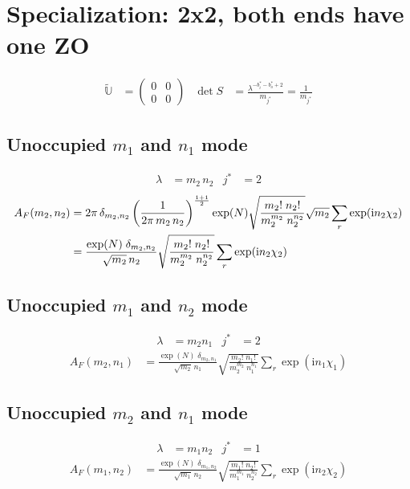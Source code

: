 \documentclass[
	english,
	a4paper,
	fontsize=10pt,
	parskip=half,
	titlepage=true,
	DIV=12,
	final
]{scrreprt}
\newcommand*{\iunit}{\ensuremath{\mathrm{i}}}
\begin{document}
\section{Specialization: 2x2, both ends have one ZO}
\begin{align}
	\tilde{\mathbb{U}}
&=
	\begin{pmatrix}
		0 & 0 \\ 0 & 0
	\end{pmatrix}
&
	\det S
&=
	\frac{ \lambda^{-b_i^* - b_o^* + 2} }{ m_{j^*} }
=
	\frac{1}{m_{j^*}}
\end{align}

\subsection{Unoccupied $m_1$ and $n_1$ mode}
\begin{align}
	\lambda &= m_2 \, n_2
&
	j^* &= 2
\end{align}
\begin{align}
	A_F(m_2, n_2)
&=
	2\pi \, \delta_{m_2,n_2} \, \qty(
		\frac{1}{2\pi \, m_2 \, n_2}
	)^{\frac{1 + 1}{2}}
	\exp(N)
	\sqrt{\frac
		{ m_2!      \; n_2! }
		{ m_2^{m_2} \; n_2^{n_2} }
	}
	\sqrt{m_2}
	\sum_r
		\exp( \iunit n_2 \chi_2 )
	\\
&=
	\frac
		{\exp(N) \; \delta_{m_2,n_2}}
		{\sqrt{m_2} \, n_2}
	\sqrt{\frac
		{ m_2!      \; n_2! }
		{ m_2^{m_2} \; n_2^{n_2} }
	}
	\sum_r
		\exp( \iunit n_2 \chi_2 )
\end{align}

\subsection{Unoccupied $m_1$ and $n_2$ mode}
\begin{align}
	\lambda &= m_2 n_1
&
	j^* &= 2
\end{align}
\begin{align}
	A_F(m_2, n_1)
&=
	\frac
		{\exp(N) \; \delta_{m_2,n_1}}
		{\sqrt{m_2} \, n_1}
	\sqrt{\frac
		{ m_2!      \; n_1! }
		{ m_2^{m_2} \; n_1^{n_1} }
	}
	\sum_r
		\exp( \iunit n_1 \chi_1 )
\end{align}

\subsection{Unoccupied $m_2$ and $n_1$ mode}
\begin{align}
	\lambda &= m_1 n_2
&
	j^* &= 1
\end{align}
\begin{align}
	A_F(m_1, n_2)
&=
	\frac
		{\exp(N) \; \delta_{m_1,n_2}}
		{\sqrt{m_1} \, n_2}
	\sqrt{\frac
		{ m_1!      \; n_2! }
		{ m_1^{m_1} \; n_2^{n_2} }
	}
	\sum_r
		\exp( \iunit n_2 \chi_2 )
\end{align}
\end{document}
